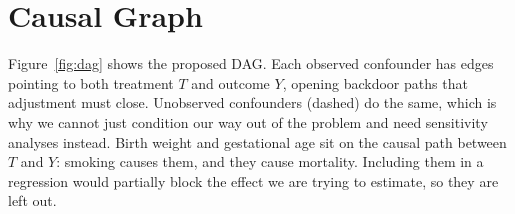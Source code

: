 \documentclass[11pt]{article}
\begin{document}
\section{Causal Graph}

Figure~\ref{fig:dag} shows the proposed DAG. Each observed confounder
has edges pointing to both treatment $T$ and outcome $Y$, opening backdoor
paths that adjustment must close. Unobserved confounders (dashed) do the same,
which is why we cannot just condition our way out of the problem and need
sensitivity analyses instead. Birth weight and gestational age sit on the
causal path between $T$ and $Y$: smoking causes them, and they cause mortality.
Including them in a regression would partially block the effect we are trying
to estimate, so they are left out.
\end{document}
